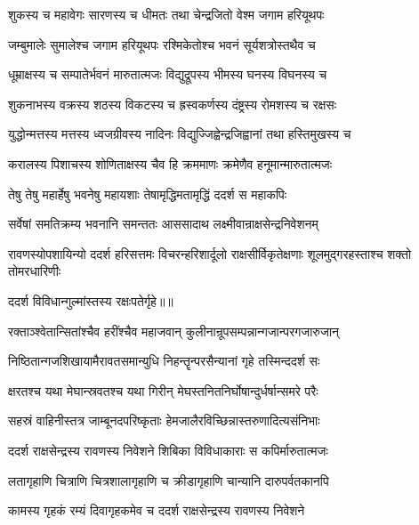 \twolineshloka
{शुकस्य च महावेगः सारणस्य च धीमतः}
{तथा चेन्द्रजितो वेश्म जगाम हरियूथपः} %

\twolineshloka
{जम्बुमालेः सुमालेश्च जगाम हरियूथपः}
{रश्मिकेतोश्च भवनं सूर्यशत्रोस्तथैव च} %

\twolineshloka
{धूम्राक्षस्य च सम्पातेर्भवनं मारुतात्मजः}
{विद्युद्रूपस्य भीमस्य घनस्य विघनस्य च} %

\twolineshloka
{शुकनाभस्य वक्रस्य शठस्य विकटस्य च}
{ह्रस्वकर्णस्य दंष्ट्रस्य रोमशस्य च रक्षसः} %

\twolineshloka
{युद्धोन्मत्तस्य मत्तस्य ध्वजग्रीवस्य नादिनः}
{विद्युज्जिह्वेन्द्रजिह्वानां तथा हस्तिमुखस्य च} %

\twolineshloka
{करालस्य पिशाचस्य शोणिताक्षस्य चैव हि}
{क्रममाणः क्रमेणैव हनूमान्मारुतात्मजः} %

\twolineshloka
{तेषु तेषु महार्हेषु भवनेषु महायशाः}
{तेषामृद्धिमतामृद्धिं ददर्श स महाकपिः} %

\twolineshloka
{सर्वेषां समतिक्रम्य भवनानि समन्ततः}
{आससादाथ लक्ष्मीवान्राक्षसेन्द्रनिवेशनम्} %

\threelineshloka
{रावणस्योपशायिन्यो ददर्श हरिसत्तमः}
{विचरन्हरिशार्दूलो राक्षसीर्विकृतेक्षणाः}
{शूलमुद्गरहस्ताश्च शक्तो तोमरधारिणीः} %

{ददर्श विविधान्गुल्मांस्तस्य रक्षःपतेर्गृहे॥॥} %

\addtocounter{shlokacount}{1}

\twolineshloka
{रक्ताञ्श्वेतान्सितांश्चैव हरींश्चैव महाजवान्}
{कुलीनान्रूपसम्पन्नान्गजान्परगजारुजान्} %

\twolineshloka
{निष्ठितान्गजशिखायामैरावतसमान्युधि}
{निहन्तॄन्परसैन्यानां गृहे तस्मिन्ददर्श सः} %

\twolineshloka
{क्षरतश्च यथा मेघान्स्रवतश्च यथा गिरीन्}
{मेघस्तनितनिर्घोषान्दुर्धर्षान्समरे परैः} %

\twolineshloka
{सहस्रं वाहिनीस्तत्र जाम्बूनदपरिष्कृताः}
{हेमजालैरविच्छिन्नास्तरुणादित्यसंनिभाः} %

\twolineshloka
{ददर्श राक्षसेन्द्रस्य रावणस्य निवेशने}
{शिबिका विविधाकाराः स कपिर्मारुतात्मजः} %

\twolineshloka
{लतागृहाणि चित्राणि चित्रशालागृहाणि च}
{क्रीडागृहाणि चान्यानि दारुपर्वतकानपि} %

\twolineshloka
{कामस्य गृहकं रम्यं दिवागृहकमेव च}
{ददर्श राक्षसेन्द्रस्य रावणस्य निवेशने} %

